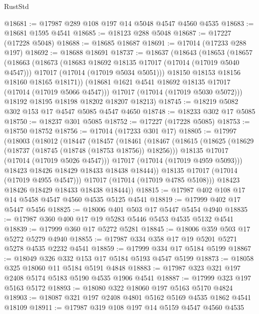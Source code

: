\begin{lexlean}{RustStd}
\begin{coremodule}
@18681 := @17987 @289 @108 @197 @14 @5048 @4547 @4560 @4535
@18683 := @18681 @1595 @4541
@18685 := @18123 @288 @5048
@18687 := @17227 (@17228 @5048)
@18688 := @18685 @18687
@18691 := @17014 (@17233 @288 @197)
@18692 := @18688 @18691
@18737 := @18637
    (@18643
      (@18653
        (@18657
          (@18663
            (@18673
              (@18683 @18692 @18135 @17017 (@17014 (@17019 @5040 @4547)))
              @17017
              (@17014 (@17019 @5034 @5051)))
            @18150
            @18153
            @18156
            @18160
            @18165
            @18171))
        (@18681 @1621 @4541 @18692 @18135 @17017 (@17014 (@17019 @5066 @4547)))
        @17017
        (@17014 (@17019 @5030 @5072)))
      @18192
      @18195
      @18198
      @18202
      @18207
      @18213)
@18745 := @18219 @5082 @302 @153 @17 @4547 @5085 @4547 @4650
@18748 := @18233 @302 @17 @5085
@18750 := @18237 @301 @5085
@18752 := @17227 (@17228 @5085)
@18753 := @18750 @18752
@18756 := @17014 (@17233 @301 @17)
@18805 := @17997
    (@18003
      (@18012
        (@18447
          (@18457
            (@18461
              (@18467
                (@18615
                  (@18625
                    (@18629 (@18737 (@18745 (@18748 (@18753 @18756)) @18256)))
                    @18135
                    @17017
                    (@17014 (@17019 @5026 @4547)))
                  @17017
                  (@17014 (@17019 @4959 @5093)))
                @18423
                @18426
                @18429
                @18433
                @18438
                @18444))
            @18135
            @17017
            (@17014 (@17019 @4955 @4547)))
          @17017
          (@17014 (@17019 @4785 @5108)))
        @18423
        @18426
        @18429
        @18433
        @18438
        @18444))
@18815 := @17987 @402 @108 @17 @14 @5458 @4547 @4560 @4535 @5125 @4541
@18819 := @17999 @402 @17 @5447 @5456
@18825 := @18006 @401 @503 @17 @5447 @5454 @4940
@18835 := @17987 @360 @400 @17 @19 @5283 @5446 @5453 @4535 @5132 @4541
@18839 := @17999 @360 @17 @5272 @5281
@18845 := @18006 @359 @503 @17 @5272 @5279 @4940
@18855 := @17987 @334 @358 @17 @19 @5201 @5271 @5278 @4535 @2232 @4541
@18859 := @17999 @334 @17 @5184 @5199
@18867 := @18049 @326 @332 @153 @17 @5184 @5193 @4547 @5199
@18873 := @18058 @325 @18060 @11 @5184 @5191 @4848
@18883 := @17987 @323 @321 @197 @2408 @5174 @5183 @5190 @4535 @1906 @4541
@18887 := @17999 @323 @197 @5163 @5172
@18893 := @18080 @322 @18060 @197 @5163 @5170 @4824
@18903 := @18087 @321 @197 @2408 @4801 @5162 @5169 @4535 @1862 @4541 @18109
@18911 := @17987 @319 @108 @197 @14 @5159 @4547 @4560 @4535

\end{coremodule}
\end{lexlean}
